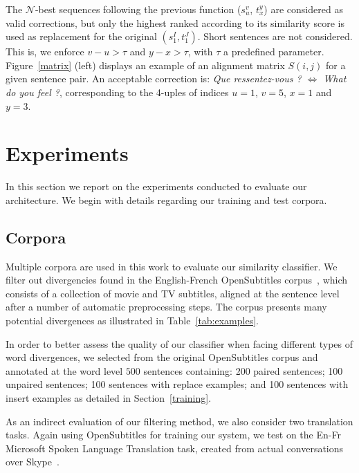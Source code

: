 \documentclass[11pt,a4paper]{article}
\begin{document}
The $\mathcal{N}$-best sequences following the previous function ($s_u^v$, $t_x^y$) are considered as valid corrections, but only the highest ranked according to its similarity score is used as replacement for the original $(s_1^I, t_1^J)$.
Short sentences are not considered. This is, we enforce $v - u > \tau$
and $y - x > \tau $, with $\tau$ a predefined parameter. 
Figure~\ref{matrix} (left) displays an example of an alignment matrix $S(i,j)$ for a given sentence pair. 
An acceptable correction is: \textit{Que ressentez-vous ?
  $\Leftrightarrow$ What do you feel ?}, corresponding to the 4-uples
of indices $u=1$, $v=5$, $x=1$ and $y=3$.

\section{Experiments}
\label{experiments}

In this section we report on the experiments conducted to evaluate our
architecture. We begin with details regarding our training and test corpora.

\subsection{Corpora}
\label{corpora}

Multiple corpora are used in this work to evaluate our similarity classifier.
We filter out divergencies found in the English-French OpenSubtitles corpus~\cite{LisonTiedemann2016}, which consists of a collection of movie and TV subtitles, aligned at the sentence level after a number of automatic preprocessing steps. 
The corpus presents many potential divergences as illustrated in Table~\ref{tab:examples}. 

In order to better assess the quality of our classifier when facing different types of word divergences, we selected from the original OpenSubtitles corpus and annotated at the word level $500$ sentences containing:
200 paired sentences;
100 unpaired sentences;
100 sentences with replace examples; and
100 sentences with insert examples as detailed in Section~\ref{training}.

As an indirect evaluation of our filtering method, we also consider
two translation tasks.
Again using OpenSubtitles for training our system, we test on the En-Fr Microsoft Spoken Language Translation task, created from actual conversations over Skype~\cite{mslt-corpus-iwslt-2016-release}. 
\end{document}
